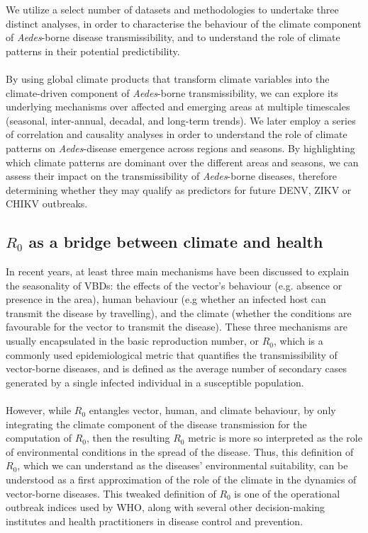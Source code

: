 \documentclass[10pt,twocolumn]{wlscirep}
\begin{document}
We utilize a select number of datasets and methodologies to undertake three distinct analyses, in order to characterise the behaviour of the climate component of \textit{Aedes}-borne disease transmissibility, and to understand the role of climate patterns in their potential predictibility.
\\
\\
By using global climate products that transform climate variables into the climate-driven component of \textit{Aedes}-borne transmissibility, we can explore its underlying mechanisms over affected and emerging areas at multiple timescales (seasonal, inter-annual, decadal, and long-term trends). We later employ a series of correlation and causality analyses in order to understand the role of climate patterns on \textit{Aedes}-disease emergence across regions and seasons. By highlighting which climate patterns are dominant over the different areas and seasons, we can assess their impact on the transmissibility of \textit{Aedes}-borne diseases, therefore determining whether they may qualify as predictors for future DENV, ZIKV or CHIKV outbreaks.

\subsection{$R_0$ as a bridge between climate and health} \label{sec-methods-redefining-R0}

In recent years, at least three main mechanisms have been discussed to explain the seasonality of VBDs\cite{moriyama_2020}: the effects of the vector's behaviour (e.g. absence or presence in the area), human behaviour (e.g whether an infected host can transmit the disease by travelling), and the climate (whether the conditions are favourable for the vector to transmit the disease). These three mechanisms are usually encapsulated in the basic reproduction number, or $R_0$, which is a commonly used epidemiological metric that quantifies the transmissibility of vector-borne diseases, and is defined as the average number of secondary cases generated by a single infected individual in a susceptible population\cite{dietz_1993}.
\\
\\
However, while $R_0$ entangles vector, human, and climate behaviour, by only integrating the climate component of the disease transmission for the computation of $R_0$, then the resulting $R_0$ metric is more so interpreted as the role of environmental conditions in the spread of the disease. Thus, this definition of $R_0$, which we can understand as the diseases' environmental suitability, can be understood as a first approximation of the role of the climate in the dynamics of vector-borne diseases. This tweaked definition of $R_0$ is one of the operational outbreak indices used by WHO, along with several other decision-making institutes and health practitioners in disease control and prevention\cite{OMS_2017, chiew_2014}.
\end{document}
